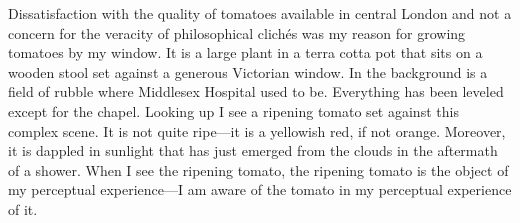 \documentclass[12pt]{article}
\begin{document}
Dissatisfaction with the quality of tomatoes available in central London and not a concern for the veracity of philosophical clichés was my reason for growing tomatoes by my window. It is a large plant in a terra cotta pot that sits on a wooden stool set against a generous Victorian window. In the background is a field of rubble where Middlesex Hospital used to be. Everything has been leveled except for the chapel. Looking up I see a ripening tomato set against this complex scene. It is not quite ripe---it is a yellowish red, if not orange. Moreover, it is dappled in sunlight that has just emerged from the clouds in the aftermath of a shower. When I see the ripening tomato, the ripening tomato is the object of my perceptual experience---I am aware of the tomato in my perceptual experience of it. 

\end{document}
